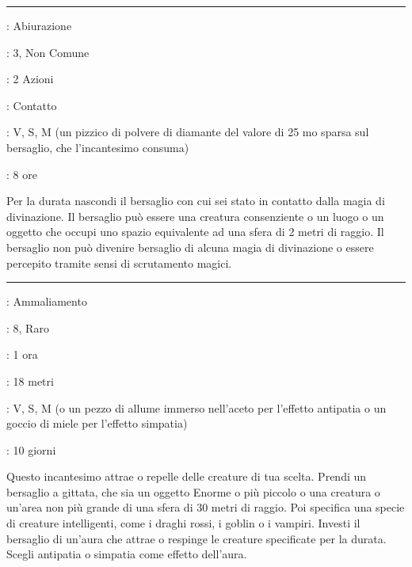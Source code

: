 \begin{multicols}{2}
\smallskip\noindent\rule{\linewidth}{2pt} \hypertarget{Anti-Individuazione}{}\smallskip{}
\noindent
\begin{description}[noitemsep, topsep=0pt, parsep=0pt, partopsep=0pt, leftmargin=0cm, labelwidth=2.8cm]
	\item[\textbf{Lista di Magia}]: Abiurazione
	\item[\textbf{Livello}]: 3, Non Comune
	\item[\textbf{T. di Lancio}]: 2 Azioni
	\item[\textbf{Gittata}]: Contatto
	\item[\textbf{Componenti}]: V, S, M (un pizzico di polvere di diamante del valore di 25 mo sparsa sul bersaglio, che l'incantesimo consuma)
	\item[\textbf{Durata}]: 8 ore
\end{description}

Per la durata nascondi il bersaglio con cui sei stato in contatto dalla magia di divinazione. Il bersaglio può essere una creatura consenziente o un luogo o un oggetto che occupi uno spazio equivalente ad una sfera di 2 metri di raggio. Il bersaglio non può divenire bersaglio di alcuna magia di divinazione o essere percepito tramite sensi di scrutamento magici.

\smallskip\noindent\rule{\linewidth}{2pt} \hypertarget{Antipatia/Simpatia}{}\smallskip{}
\noindent
\begin{description}[noitemsep, topsep=0pt, parsep=0pt, partopsep=0pt, leftmargin=0cm, labelwidth=2.8cm]
	\item[\textbf{Lista di Magia}]: Ammaliamento
	\item[\textbf{Livello}]: 8, Raro
	\item[\textbf{T. di Lancio}]: 1 ora
	\item[\textbf{Gittata}]: 18 metri
	\item[\textbf{Componenti}]: V, S, M (o un pezzo di allume immerso nell'aceto per l'effetto antipatia o un goccio di miele per l'effetto simpatia)
	\item[\textbf{Durata}]: 10 giorni
\end{description}

Questo incantesimo attrae o repelle delle creature di tua scelta. Prendi un bersaglio a gittata, che sia un oggetto Enorme o più piccolo o una creatura o un'area non più grande di una sfera di 30 metri di raggio. Poi specifica una specie di creature intelligenti, come i draghi rossi, i goblin o i vampiri. Investi il bersaglio di un'aura che attrae o respinge le creature specificate per la durata. Scegli antipatia o simpatia come effetto dell'aura.


\end{multicols}
